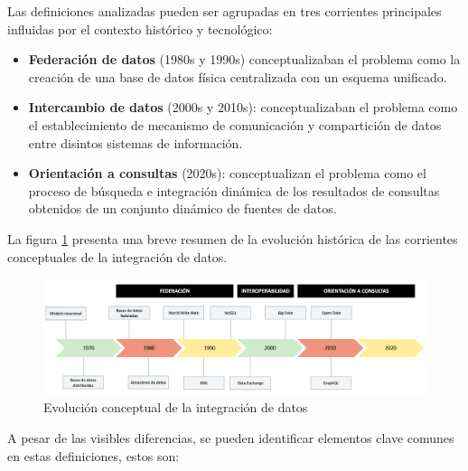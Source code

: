 Las definiciones analizadas pueden ser agrupadas en tres corrientes principales influidas
por el contexto histórico y tecnológico:
\begin{itemize}
    \item \textbf{Federación de datos} (1980s y 1990s) conceptualizaban el problema como la creación de una base de datos
    física centralizada con un esquema unificado.
    \item \textbf{Intercambio de datos} (2000s y 2010s): conceptualizaban el problema como el establecimiento de mecanismo
    de comunicación y compartición de datos entre disintos sistemas de información.
    \item \textbf{Orientación a consultas} (2020s): conceptualizan el problema como el proceso de búsqueda e integración
    dinámica de los resultados de consultas obtenidos de un conjunto dinámico de fuentes de datos.
\end{itemize}
La figura \ref{fig:data-integration-timeline} presenta una breve resumen de la evolución histórica de las corrientes
conceptuales de la integración de datos.


\begin{figure}[h!]
    \centering
    \includegraphics[width=\textwidth]{Images/data-integration-timeline.png}
    \caption{Evolución conceptual de la integración de datos}
    \label{fig:data-integration-timeline}
\end{figure}


A pesar de las visibles diferencias, se pueden identificar elementos clave comunes en estas definiciones, estos son:

